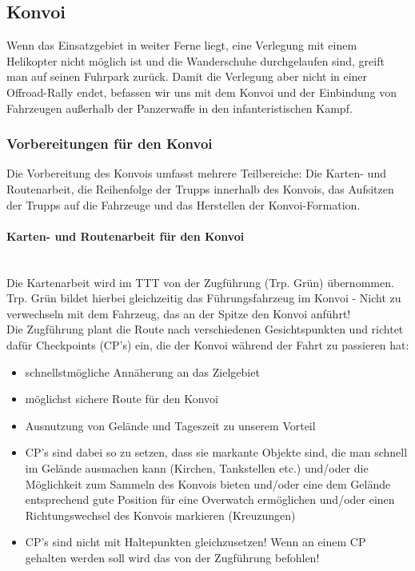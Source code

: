 \subsection{Konvoi}
	Wenn das Einsatzgebiet in weiter Ferne liegt, eine Verlegung mit einem Helikopter nicht möglich ist und die Wanderschuhe durchgelaufen sind, greift man auf seinen Fuhrpark zurück. Damit die Verlegung aber nicht in einer Offroad-Rally endet, befassen wir uns mit dem Konvoi und der Einbindung von Fahrzeugen außerhalb der Panzerwaffe in den infanteristischen Kampf. 

\subsubsection{Vorbereitungen für den Konvoi}
	Die Vorbereitung des Konvois umfasst mehrere Teilbereiche: Die Karten- und Routenarbeit, die Reihenfolge der Trupps innerhalb des Konvois, das Aufsitzen der Trupps auf die Fahrzeuge und das Herstellen der Konvoi-Formation.

\paragraph{Karten- und Routenarbeit für den Konvoi} \ \\
	Die Kartenarbeit wird im TTT von der Zugführung (Trp. Grün)  übernommen. Trp. Grün bildet hierbei gleichzeitig das Führungsfahrzeug im Konvoi - Nicht zu verwechseln mit dem Fahrzeug, das an der Spitze den Konvoi anführt! \\
	Die Zugführung plant die Route nach verschiedenen Gesichtspunkten und richtet dafür Checkpoints (CP's) ein, die der Konvoi während der Fahrt zu passieren hat: 

	\begin{itemize}
		\item schnellstmögliche Annäherung an das Zielgebiet
		\item möglichst sichere Route für den Konvoi
		\item Ausnutzung von Gelände und Tageszeit zu unserem Vorteil
		\item CP's sind dabei so zu setzen, dass sie markante Objekte sind, die man schnell im Gelände ausmachen kann (Kirchen, Tankstellen etc.) und/oder die Möglichkeit zum Sammeln des Konvois bieten und/oder eine dem Gelände entsprechend gute Position für eine Overwatch ermöglichen und/oder einen Richtungswechsel des Konvois markieren (Kreuzungen)
		\item CP's sind nicht mit Haltepunkten gleichzusetzen! Wenn an einem CP gehalten werden soll wird das von der Zugführung befohlen!
	\end{itemize}

